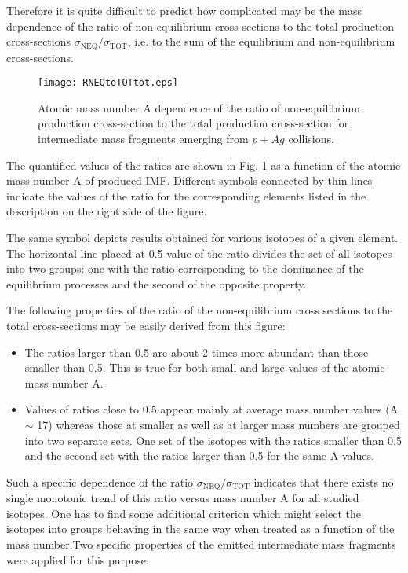 Therefore it is quite
difficult to predict 
how complicated may be the
mass dependence of the ratio of non-equilibrium cross-sections to
the total production cross-sections
$\sigma_{\text{NEQ}}/\sigma_{\text{TOT}}$, i.e.  %
 to the sum 
of the equilibrium and non-equilibrium cross-sections.
%
\begin{figure}[!h]
	\centering
		\texttt{[image: RNEQtoTOTtot.eps]}
	\caption{Atomic mass number A dependence of the ratio of non-equilibrium production
		cross-section  to the total production cross-section for intermediate mass fragments
		emerging from $p+Ag$ collisions.
	}
	\label{fig:RNEQtoTOTtot.eps}
\end{figure}
%
%

The quantified values of the ratios are shown in Fig. \ref{fig:RNEQtoTOTtot.eps} as a function of the atomic mass number A of produced IMF. Different symbols connected by thin lines indicate the values of the ratio for the corresponding elements listed in the description on the right side of the figure.
%

The same symbol depicts  results obtained for various isotopes of a given element. The horizontal line placed at 0.5 value of the ratio
divides  the set of all isotopes into two groups: one with  the
ratio corresponding to the dominance of the equilibrium processes
and the second of the opposite property.
%

The following properties of the ratio of the non-equilib\-rium cross
sections to the total cross-sections may be easily
derived from this figure: 
\begin{itemize}
\item The ratios larger than 0.5 are about 2 times more abundant
than those smaller than 0.5.  This is true for both small and large values of the atomic mass number A.

%
\item Values of  ratios close to 0.5 appear mainly at average
mass number values (A $\sim$ 17) whereas those at smaller as well
as at larger mass numbers are grouped into two separate sets.
One set of the isotopes with the ratios smaller than 0.5
and the second set with the ratios larger than 0.5 for the same A values.
\end{itemize}
Such a specific dependence of the ratio
$\sigma_{\text{NEQ}}/\sigma_{\text{TOT}}$ indicates that there
exists no single monotonic trend of this ratio versus mass number A
for all studied isotopes. One has to find some additional criterion
which might select the isotopes into groups behaving in the same way
when treated as a function of the mass number.Two specific properties of the emitted intermediate mass fragments were applied
for this purpose:

